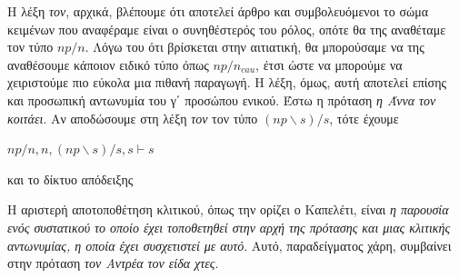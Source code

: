 \documentclass [a4paper,11pt] {book}
\theoremstyle{definition}
\theoremstyle{definition}
\begin{document}
Η λέξη \textit{τον}, αρχικά, βλέπουμε ότι αποτελεί άρθρο και συμβολευόμενοι το σώμα κειμένων που αναφέραμε είναι ο συνηθέστερός του ρόλος, οπότε θα της αναθέταμε τον τύπο $np/n$. Λόγω του ότι βρίσκεται στην αιτιατική, θα μπορούσαμε να της αναθέσουμε κάποιον ειδικό τύπο όπως $np/n_{cau}$, έτσι ώστε να μπορούμε να χειριστούμε πιο εύκολα μια πιθανή παραγωγή. Η λέξη, όμως, αυτή αποτελεί επίσης και προσωπική αντωνυμία του γ΄ προσώπου ενικού. Έστω η πρόταση \textit{η Άννα τον κοιτάει}. Αν αποδώσουμε στη λέξη \textit{τον} τον τύπο $(np\backslash s)/s$, τότε έχουμε
\begin{center}
$np/n, n, (np\backslash s)/s,s\vdash s$
\end{center}
και το δίκτυο απόδειξης
\begin{center}
\end{center}
Η αριστερή αποτοποθέτηση κλιτικού, όπως την ορίζει ο Καπελέτι, είναι \textit{η παρουσία ενός συστατικού το οποίο έχει τοποθετηθεί στην αρχή της πρότασης και μιας κλιτικής αντωνυμίας, η οποία έχει συσχετιστεί με αυτό}. Αυτό, παραδείγματος χάρη, συμβαίνει στην πρόταση \textit{τον Αντρέα τον είδα χτες}.
\end{document}
